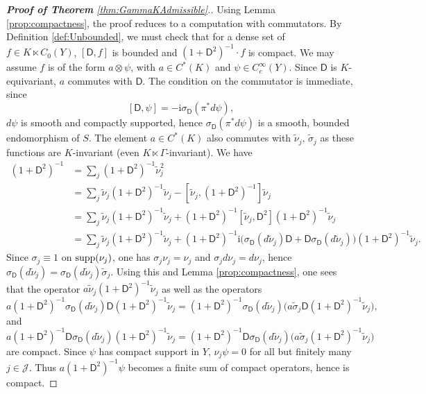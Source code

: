 \documentclass[11pt,reqno]{amsart}
\theoremstyle{definition}
\theoremstyle{remark}
\newcommand{\ti}[1]{\widetilde{#1}}
\newcommand{\st}[1]{\mathsf{#1}}
\renewcommand{\i}{{\mathrm{i}}}
\def\J{\ensuremath{\mathcal{J}}}
\def\supp{\ensuremath{\textnormal{supp}}}
\begin{document}
\begin{proof}[\textbf{Proof of Theorem} \ref{thm:GammaKAdmissible}.]
Using Lemma \ref{prop:compactness}, the proof reduces to a computation with commutators.  By Definition \ref{def:Unbounded}, we must check that for a dense set of $f \in K \ltimes C_0(Y)$, $[\st{D},f]$ is bounded and $(1+\st{D}^2)^{-1}\cdot f$ is compact.  We may assume $f$ is of the form $a\otimes \psi$, with $a \in C^\ast(K)$ and $\psi \in C_c^\infty(Y)$.  Since $\st{D}$ is $K$-equivariant, $a$ commutes with $\st{D}$.  The condition on the commutator is immediate, since
\[ [\st{D},\psi]=-\i \sigma_{\st{D}}(\pi^\ast d\psi),\]
$d\psi$ is smooth and compactly supported, hence $\sigma_{\st{D}}(\pi^\ast d\psi)$ is a smooth, bounded endomorphism of $S$.  The element $a \in C^\ast(K)$ also commutes with $\ti{\nu}_j$, $\ti{\sigma}_j$ as these functions are $K$-invariant (even $K\ltimes \Gamma$-invariant).  We have
\begin{align}
\label{eqn:expansion}
\nonumber (1+\st{D}^2)^{-1}&=\sum_j (1+\st{D}^2)^{-1}\ti{\nu}_j^2\\
\nonumber &=\sum_j \ti{\nu}_j (1+\st{D}^2)^{-1}\ti{\nu}_j-[\ti{\nu}_j,(1+\st{D}^2)^{-1}]\ti{\nu}_j\\
\nonumber &=\sum_j \ti{\nu}_j(1+\st{D}^2)^{-1}\ti{\nu}_j+(1+\st{D}^2)^{-1}[\ti{\nu}_j,\st{D}^2](1+\st{D}^2)^{-1}\ti{\nu}_j\\
\nonumber &=\sum_j \ti{\nu}_j(1+\st{D}^2)^{-1}\ti{\nu}_j+(1+\st{D}^2)^{-1}\i\Big(\sigma_{\st{D}}(d\ti{\nu}_j)\st{D}+\st{D}\sigma_{\st{D}}(d\ti{\nu}_j)\Big)(1+\st{D}^2)^{-1}\ti{\nu}_j.
\end{align}
Since $\sigma_j\equiv 1$ on $\supp(\nu_j)$, one has $\sigma_j\nu_j=\nu_j$ and $\sigma_jd\nu_j=d\nu_j$, hence $\sigma_{\st{D}}(d\ti{\nu}_j)=\sigma_{\st{D}}(d\ti{\nu}_j)\ti{\sigma}_j$.  Using this and Lemma \ref{prop:compactness}, one sees that the operator $a\ti{\nu}_j(1+\st{D}^2)^{-1}\ti{\nu}_j$ as well as the operators
\[ a(1+\st{D}^2)^{-1}\sigma_{\st{D}}(d\ti{\nu}_j)\st{D}(1+\st{D}^2)^{-1}\ti{\nu}_j=(1+\st{D}^2)^{-1}\sigma_{\st{D}}(d\ti{\nu}_j)\Big(a\ti{\sigma}_j \st{D}(1+\st{D}^2)^{-1}\ti{\nu}_j\Big),\]
and
\[ a(1+\st{D}^2)^{-1}\st{D}\sigma_{\st{D}}(d\ti{\nu}_j)(1+\st{D}^2)^{-1}\ti{\nu}_j=(1+\st{D}^2)^{-1}\st{D}\sigma_{\st{D}}(d\ti{\nu}_j)\Big(a\ti{\sigma}_j (1+\st{D}^2)^{-1}\ti{\nu}_j\Big) \]
are compact.  Since $\psi$ has compact support in $Y$, $\nu_j \psi=0$ for all but finitely many $j \in \J$.  Thus $a(1+\st{D}^2)^{-1}\psi$ becomes a finite sum of compact operators, hence is compact.
\end{proof}
\end{document}
